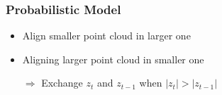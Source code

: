 \begin{frame}
  \frametitle{Probabilistic Model}
  \begin{itemize}
  \item Align smaller point cloud in larger one\\
  \pause
  \pause
  \item Aligning larger point cloud in smaller one\\
  \pause
  \pause
  \item[$\Rightarrow$] Exchange $z_t$ and $z_{t-1}$ when $|z_t|>|z_{t-1}|$
  \end{itemize}
\end{frame}

